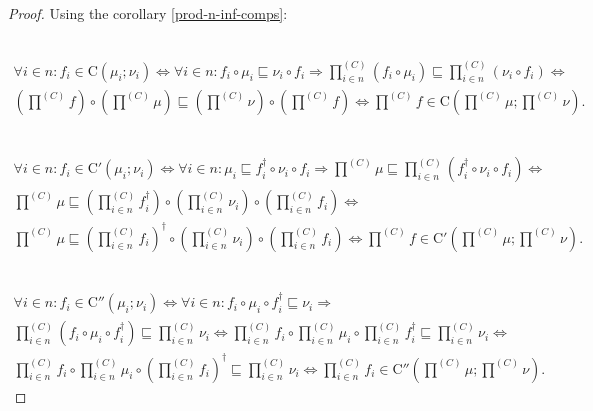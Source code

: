\begin{proof}
Using the corollary \ref{prod-n-inf-comps}:

~
\begin{multline*}
\forall i\in n:f_{i}\in\mathrm{C}(\mu_{i};\nu_{i})\Leftrightarrow\forall i\in n:f_{i}\circ\mu_{i}\sqsubseteq\nu_{i}\circ f_{i}\Rightarrow\prod_{i\in n}^{(C)}(f_{i}\circ\mu_{i})\sqsubseteq\prod_{i\in n}^{(C)}(\nu_{i}\circ f_{i})\Leftrightarrow\\
\left(\prod^{(C)}f\right)\circ\left(\prod^{(C)}\mu\right)\sqsubseteq\left(\prod^{(C)}\nu\right)\circ\left(\prod^{(C)}f\right)\Leftrightarrow\prod^{(C)}f\in\mathrm{C}\left(\prod^{(C)}\mu;\prod^{(C)}\nu\right).
\end{multline*}


~
\begin{multline*}
\forall i\in n:f_{i}\in\mathrm{C}'(\mu_{i};\nu_{i})\Leftrightarrow\forall i\in n:\mu_{i}\sqsubseteq f_{i}^{\dagger}\circ\nu_{i}\circ f_{i}\Rightarrow\prod^{(C)}\mu\sqsubseteq\prod_{i\in n}^{(C)}(f_{i}^{\dagger}\circ\nu_{i}\circ f_{i})\Leftrightarrow\\
\prod^{(C)}\mu\sqsubseteq\left(\prod_{i\in n}^{(C)}f_{i}^{\dagger}\right)\circ\left(\prod_{i\in n}^{(C)}\nu_{i}\right)\circ\left(\prod_{i\in n}^{(C)}f_{i}\right)\Leftrightarrow\\
\prod^{(C)}\mu\sqsubseteq\left(\prod_{i\in n}^{(C)}f_{i}\right)^{\dagger}\circ\left(\prod_{i\in n}^{(C)}\nu_{i}\right)\circ\left(\prod_{i\in n}^{(C)}f_{i}\right)\Leftrightarrow\prod^{(C)}f\in\mathrm{C}'\left(\prod^{(C)}\mu;\prod^{(C)}\nu\right).
\end{multline*}


~
\begin{multline*}
\forall i\in n:f_{i}\in\mathrm{C}''(\mu_{i};\nu_{i})\Leftrightarrow\forall i\in n:f_{i}\circ\mu_{i}\circ f_{i}^{\dagger}\sqsubseteq\nu_{i}\Rightarrow\\
\prod_{i\in n}^{(C)}(f_{i}\circ\mu_{i}\circ f_{i}^{\dagger})\sqsubseteq\prod_{i\in n}^{(C)}\nu_{i}\Leftrightarrow\prod_{i\in n}^{(C)}f_{i}\circ\prod_{i\in n}^{(C)}\mu_{i}\circ\prod_{i\in n}^{(C)}f_{i}^{\dagger}\sqsubseteq\prod_{i\in n}^{(C)}\nu_{i}\Leftrightarrow\\
\prod_{i\in n}^{(C)}f_{i}\circ\prod_{i\in n}^{(C)}\mu_{i}\circ\left(\prod_{i\in n}^{(C)}f_{i}\right)^{\dagger}\sqsubseteq\prod_{i\in n}^{(C)}\nu_{i}\Leftrightarrow\prod_{i\in n}^{(C)}f_{i}\in\mathrm{C}''\left(\prod^{(C)}\mu;\prod^{(C)}\nu\right).
\end{multline*}
\end{proof}
